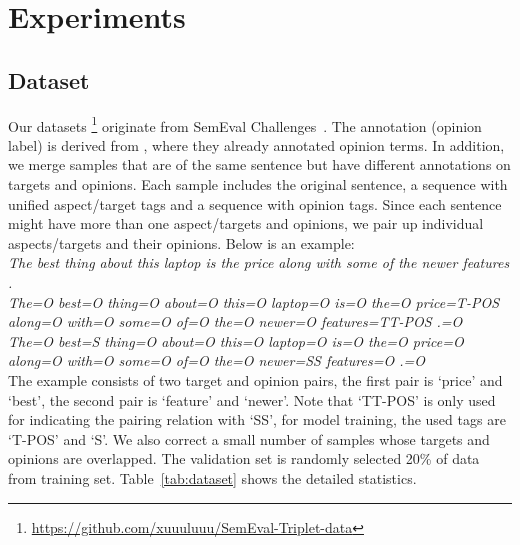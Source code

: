 \documentclass[letterpaper]{article} \usepackage{aaai20}  \usepackage{times}  \usepackage{helvet} \usepackage{courier}  \usepackage[hyphens]{url}  \usepackage{graphicx} \urlstyle{rm} \def\UrlFont{\rm}  \usepackage{graphicx}  \frenchspacing  \setlength{\pdfpagewidth}{8.5in}  \setlength{\pdfpageheight}{11in}
\begin{document}
\section{Experiments}\label{sec:experiments}
\subsection{Dataset}
Our datasets \footnote{\url{https://github.com/xuuuluuu/SemEval-Triplet-data}} originate from SemEval Challenges~\cite{S14-2004,S15-2082,S16-1002}. The annotation (opinion label) is derived from \cite{fan2019target}, where they already annotated opinion terms. In addition, we merge samples that are of the same sentence but have different annotations on targets and opinions. Each sample includes the original sentence, a sequence with unified aspect/target tags and a sequence with opinion tags. Since each sentence might have more than one aspect/targets and opinions, we pair up individual aspects/targets and their opinions. Below is an example:\vspace{2mm}\\
\textit{
The best thing about this laptop is the price along with some of the newer features . \vspace{1mm}\\
The=O best=O thing=O about=O this=O laptop=O is=O the=O price=T-POS along=O with=O some=O of=O the=O newer=O features=TT-POS .=O \vspace{1mm}\\
The=O best=S thing=O about=O this=O laptop=O is=O the=O price=O along=O with=O some=O of=O the=O newer=SS features=O .=O\vspace{2mm}\\}
The example consists of two  target and opinion pairs, the first pair is `price' and `best', the second pair is `feature' and `newer'. Note that `TT-POS' is only used for indicating the pairing relation with `SS', for model training, the used tags are `T-POS' and `S'.
We also correct a small number of samples whose targets and opinions are overlapped. The validation set is randomly selected 20\% of data from training set. Table~\ref{tab:dataset} shows the detailed statistics.
\end{document}
